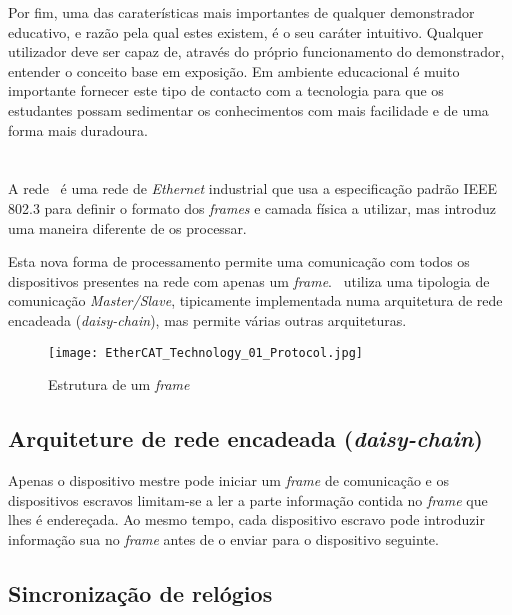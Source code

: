 Por fim, uma das caraterísticas mais importantes de qualquer demonstrador
educativo, e razão pela qual estes existem, é o seu caráter intuitivo.
Qualquer utilizador deve ser capaz de, através do próprio funcionamento
do demonstrador, entender o conceito base em exposição. Em ambiente
educacional é muito importante fornecer este tipo de contacto com a
tecnologia para que os estudantes possam sedimentar os conhecimentos com
mais facilidade e de uma forma mais duradoura. %


\section{\ecat}\label{sec:ethercat}

A rede \ecat\ é uma rede de \emph{Ethernet} industrial que usa a
especificação padrão IEEE 802.3 \cite[]{ieee:IEEEStandardEthernet} para
definir o formato dos \emph{frames} e camada física a utilizar, mas
introduz uma maneira diferente de os processar.

Esta nova forma de processamento permite uma comunicação com todos os
dispositivos presentes na rede com apenas um \emph{frame}. \ecat\ utiliza
uma tipologia de comunicação \emph{Master/Slave}, tipicamente implementada
numa arquitetura de rede encadeada (\emph{daisy-chain}), mas permite várias
outras arquiteturas.

\begin{figure}[htp]
 \centering
 \texttt{[image: EtherCAT\_Technology\_01\_Protocol.jpg]}
 \caption{Estrutura de um \emph{frame} \ecat \cite[]{group:EtherCAT}}
 \label{fig:ecat-frame}
\end{figure}


\subsection{Arquiteture de rede encadeada (\emph{daisy-chain})}
\label{sec:daisychain}
Apenas o dispositivo mestre pode iniciar um \emph{frame} de comunicação
e os dispositivos escravos limitam-se a ler a parte informação contida
no \emph{frame} que lhes é endereçada. Ao mesmo tempo, cada dispositivo
escravo pode introduzir informação sua  no \emph{frame} antes de o enviar
para o dispositivo seguinte.

\subsection{Sincronização de relógios}

